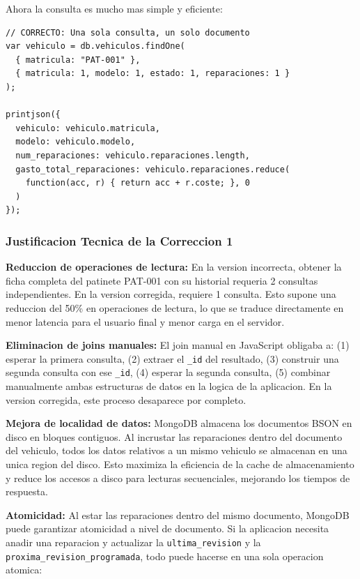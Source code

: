 Ahora la consulta es mucho mas simple y eficiente:

\begin{lstlisting}[caption=Consulta corregida: un solo viaje de red]
// CORRECTO: Una sola consulta, un solo documento
var vehiculo = db.vehiculos.findOne(
  { matricula: "PAT-001" },
  { matricula: 1, modelo: 1, estado: 1, reparaciones: 1 }
);

printjson({
  vehiculo: vehiculo.matricula,
  modelo: vehiculo.modelo,
  num_reparaciones: vehiculo.reparaciones.length,
  gasto_total_reparaciones: vehiculo.reparaciones.reduce(
    function(acc, r) { return acc + r.coste; }, 0
  )
});
\end{lstlisting}

\subsubsection{Justificacion Tecnica de la Correccion 1}

\textbf{Reduccion de operaciones de lectura:} En la version incorrecta, obtener la ficha completa del patinete PAT-001 con su historial requeria 2 consultas independientes. En la version corregida, requiere 1 consulta. Esto supone una reduccion del 50\% en operaciones de lectura, lo que se traduce directamente en menor latencia para el usuario final y menor carga en el servidor.

\textbf{Eliminacion de joins manuales:} El join manual en JavaScript obligaba a: (1) esperar la primera consulta, (2) extraer el \texttt{\_id} del resultado, (3) construir una segunda consulta con ese \texttt{\_id}, (4) esperar la segunda consulta, (5) combinar manualmente ambas estructuras de datos en la logica de la aplicacion. En la version corregida, este proceso desaparece por completo.

\textbf{Mejora de localidad de datos:} MongoDB almacena los documentos BSON en disco en bloques contiguos. Al incrustar las reparaciones dentro del documento del vehiculo, todos los datos relativos a un mismo vehiculo se almacenan en una unica region del disco. Esto maximiza la eficiencia de la cache de almacenamiento y reduce los accesos a disco para lecturas secuenciales, mejorando los tiempos de respuesta.

\textbf{Atomicidad:} Al estar las reparaciones dentro del mismo documento, MongoDB puede garantizar atomicidad a nivel de documento. Si la aplicacion necesita anadir una reparacion y actualizar la \texttt{ultima\_revision} y la \texttt{proxima\_revision\_programada}, todo puede hacerse en una sola operacion atomica:

